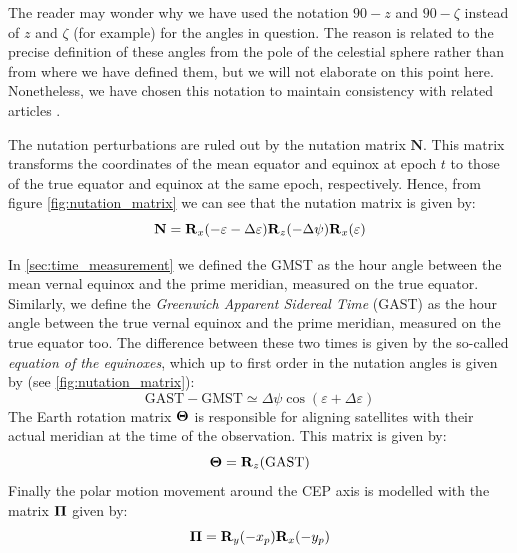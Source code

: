 \documentclass[../main.tex]{subfiles}
\begin{document}
The reader may wonder why we have used the notation $90-z$ and $90-\zeta$ instead of $z$ and $\zeta$ (for example) for the angles in question. The reason is related to the precise definition of these angles from the pole of the celestial sphere rather than from where we have defined them, but we will not elaborate on this point here. Nonetheless, we have chosen this notation to maintain consistency with related articles \cite{lieske}.

The nutation perturbations are ruled out by the nutation matrix $\mathbf{N}$. This matrix transforms the coordinates of the mean equator and equinox at epoch $t$ to those of the true equator and equinox at the same epoch, respectively. Hence, from figure \cref{fig:nutation_matrix} we can see that the nutation matrix is given by:
\begin{equation}
  \mathbf{N}=\boldsymbol{\mathrm{R}}_x(-\varepsilon-\Delta \varepsilon)\boldsymbol{\mathrm{R}}_z(-\Delta \psi)\boldsymbol{\mathrm{R}}_x(\varepsilon)
\end{equation}

In \cref{sec:time_measurement} we defined the GMST as the hour angle between the mean vernal equinox and the prime meridian, measured on the true equator. Similarly, we define the \emph{Greenwich Apparent Sidereal Time} (GAST) as the hour angle between the true vernal equinox and the prime meridian, measured on the true equator too. The difference between these two times is given by the so-called \emph{equation of the equinoxes}, which up to first order in the nutation angles is given by (see \cref{fig:nutation_matrix}):
\begin{equation}
  \text{GAST}- \text{GMST}\simeq\Delta \psi\cos(\varepsilon+\Delta \varepsilon)
\end{equation}
The Earth rotation matrix $\boldsymbol{\mathrm{\Theta}}$ is responsible for aligning satellites with their actual meridian at the time of the observation. This matrix is given by:
\begin{equation}
  \boldsymbol{\mathrm{\Theta}}=\boldsymbol{\mathrm{R}}_z(\text{GAST})
\end{equation}
Finally the polar motion movement around the CEP axis is modelled with the matrix $\boldsymbol{\mathrm{\Pi}}$ given by:
\begin{equation}
  \boldsymbol{\mathrm{\Pi}}=\boldsymbol{\mathrm{R}}_y(- x_p)\boldsymbol{\mathrm{R}}_x(- y_p)
\end{equation}
\end{document}
